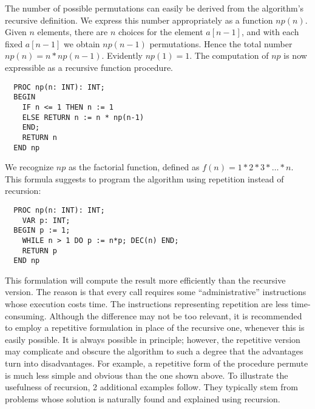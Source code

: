The number of possible permutations can easily be derived from the algorithm's recursive
definition. We express this number appropriately as a function $np(n)$. Given $n$ elements,
there are $n$ choices for the element $a[n-1]$, and with each fixed $a[n-1]$ we obtain
$np(n-1)$ permutations. Hence the total number $np(n) = n*np(n-1)$. Evidently $np(1) = 1$.
The computation of $np$ is now expressible as a recursive function procedure.
\begin{verbatim}
  PROC np(n: INT): INT;
  BEGIN
    IF n <= 1 THEN n := 1
    ELSE RETURN n := n * np(n-1)
    END;
    RETURN n
  END np
\end{verbatim}
We recognize $np$ as the factorial function, defined as $f(n)=1*2*3*\dots *n$. This formula
suggests to program the algorithm using repetition instead of recursion:
\begin{verbatim}
  PROC np(n: INT): INT;
    VAR p: INT;
  BEGIN p := 1;
    WHILE n > 1 DO p := n*p; DEC(n) END;
    RETURN p
  END np
\end{verbatim}
This formulation will compute the result more efficiently than the recursive version. The
reason is that every call requires some “administrative” instructions whose execution
costs time. The instructions representing repetition are less time-consuming. Although
the difference may not be too relevant, it is recommended to employ a repetitive formulation
in place of the recursive one, whenever this is easily possible. It is always possible in
principle; however, the repetitive version may complicate and obscure the algorithm to
such a degree that the advantages turn into disadvantages. For example, a repetitive form
of the procedure permute is much less simple and obvious than the one shown above. To
illustrate the usefulness of recursion, 2 additional examples follow. They typically stem
from problems whose solution is naturally found and explained using recursion.

